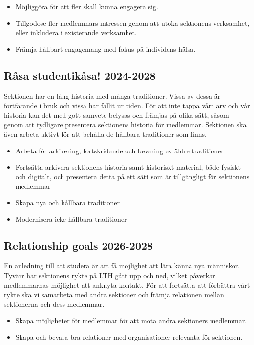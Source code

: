 \documentclass[nopdfbookmarks,a4paper, 11pt, twoside]{article}
\begin{document}
\begin{itemize}
    \item Möjliggöra för att fler skall kunna engagera sig.
    \item Tillgodose fler medlemmars intressen genom att utöka sektionens verksamhet, eller inkludera i existerande verksamhet.
    \item Främja hållbart engagemang med fokus på individens hälsa.
\end{itemize}

\subsection{Råsa studentikåsa! 2024-2028}
Sektionen har en lång historia med många traditioner. Vissa av dessa är fortfarande i bruk och vissa har fallit ur tiden. För att inte tappa vårt arv och vår historia kan det med gott samvete belysas och främjas på olika sätt, såsom genom att tydligare presentera sektionens historia för medlemmar. Sektionen ska även arbeta aktivt för att behålla de hållbara traditioner som finns.
\begin{itemize}
    \item Arbeta för arkivering, fortskridande och bevaring av äldre traditioner
    \item Fortsätta arkivera sektionens historia samt historiskt material, både fysiskt och digitalt, och presentera detta på ett sätt som är tillgängligt för sektionens medlemmar
    \item Skapa nya och hållbara traditioner
    \item Modernisera icke hållbara traditioner
\end{itemize}

\subsection{Relationship goals 2026-2028}
En anledning till att studera är att få möjlighet att lära känna nya människor. Tyvärr har sektionens rykte på LTH gått upp och ned, vilket påverkar medlemmarnas möjlighet att anknyta kontakt. För att fortsätta att förbättra vårt rykte ska vi samarbeta med andra sektioner och främja relationen mellan sektionerna och dess medlemmar.

\begin{itemize}
    \item Skapa möjligheter för medlemmar för att möta andra sektioners medlemmar.
    \item Skapa och bevara bra relationer med organisationer relevanta för sektionen.
\end{itemize}
\end{document}

